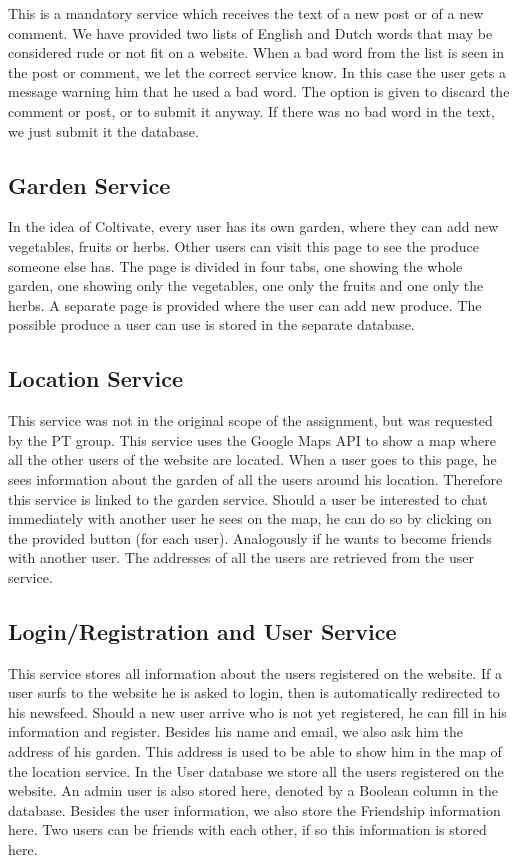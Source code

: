 \documentclass[a4paper,12pt]{article}
\begin{document}
This is a mandatory service which receives the text of a new post or of a new comment. We have provided two lists of English and Dutch words that may be considered rude or not fit on a website. When a bad word from the list is seen in the post or comment, we let the correct service know. In this case the user gets a message warning him that he used a bad word. The option is given to discard the comment or post, or to submit it anyway. If there was no bad word in the text, we just submit it the database.

\subsection{Garden Service}

In the idea of Coltivate, every user has its own garden, where they can add new vegetables, fruits or herbs. Other users can visit this page to see the produce someone else has. The page is divided in four tabs, one showing the whole garden, one showing only the vegetables, one only the fruits and one only the herbs. A separate page is provided where the user can add new produce. The possible produce a user can use is stored in the separate database.

\subsection{Location Service}

This service was not in the original scope of the assignment, but was requested by the PT group. This service uses the Google Maps API to show a map where all the other users of the website are located. When a user goes to this page, he sees information about the garden of all the users around his location. Therefore this service is linked to the garden service. Should a user be interested to chat immediately with another user he sees on the map, he can do so by clicking on the provided button (for each user). Analogously if he wants to become friends with another user. The addresses of all the users are retrieved from the user service.

\subsection{Login/Registration and User Service}

This service stores all information about the users registered on the website. If a user surfs to the website he is asked to login, then is automatically redirected to his newsfeed. Should a new user arrive who is not yet registered, he can fill in his information and register. Besides his name and email, we also ask him the address of his garden. This address is used to be able to show him in the map of the location service. In the User database we store all the users registered on the website. An admin user is also stored here, denoted by a Boolean column in the database. Besides the user information, we also store the Friendship information here. Two users can be friends with each other, if so this information is stored here.
\newline
\end{document}
